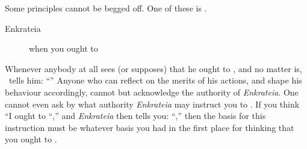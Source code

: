 \documentclass[11pt,letterpaper,oneside]{amsart}
\begin{document}
Some principles cannot be begged off. One of these is \enk. \begin{description}\item[Enkrateia]  when you ought to  \end{description} Whenever anybody at all sees (or supposes) that he ought to , and no matter  is, \enk\ tells him: ``''  Anyone who can reflect on the merits of his actions, and shape his behaviour accordingly, cannot but acknowledge the authority of \emph{Enkrateia}. One cannot even ask by what authority \emph{Enkrateia} may instruct you to . If you think ``I ought to ``,'' and \emph{Enkrateia} then tells you: ``,'' then the basis for this instruction must be whatever basis you had in the first place for thinking that you ought to .

























\end{document}
